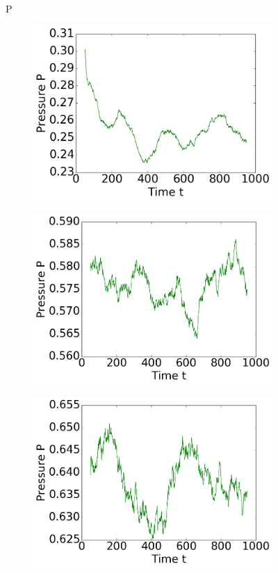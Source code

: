 \begin{figure}[ht]
P
\hfill
\begin{subfigure}{0.3\textwidth}
\includegraphics[width=\textwidth]{../dat/avPressure_T0d3_M100.png}
\end{subfigure}
\hfill
\begin{subfigure}{0.3\textwidth}
\includegraphics[width=\textwidth]{../dat/avPressure_T1d0_M100.png}
\end{subfigure}
\hfill
\begin{subfigure}{0.3\textwidth}
\includegraphics[width=\textwidth]{../dat/avPressure_T2d0_M100.png}
\end{subfigure}


\end{figure}
